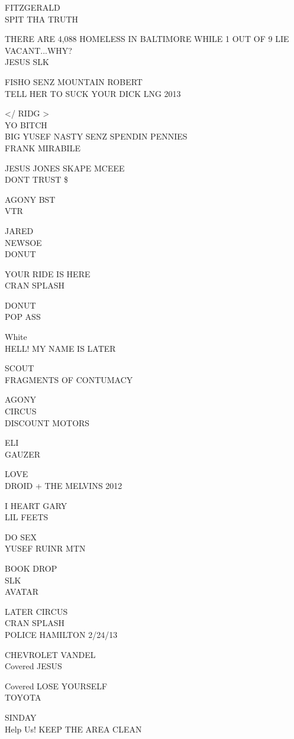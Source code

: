 \documentclass[10pt,letterpaper]{article}
\begin{document}
FITZGERALD\\
SPIT THA TRUTH

THERE ARE 4,088 HOMELESS IN BALTIMORE WHILE 1 OUT OF 9 LIE VACANT...WHY?\\
JESUS SLK

FISHO SENZ MOUNTAIN ROBERT\\
TELL HER TO SUCK YOUR DICK LNG 2013

</  RIDG >\\
YO BITCH\\
BIG YUSEF NASTY SENZ SPENDIN PENNIES\\
FRANK MIRABILE

JESUS JONES SKAPE MCEEE\\
DONT TRUST \$

AGONY BST\\
VTR

JARED\\
NEWSOE\\
DONUT

YOUR RIDE IS HERE\\
CRAN SPLASH

DONUT\\
POP ASS

White\\
HELL! MY NAME IS LATER

SCOUT\\
FRAGMENTS OF CONTUMACY

AGONY\\
CIRCUS\\
DISCOUNT MOTORS

ELI\\
GAUZER

LOVE\\
DROID + THE MELVINS 2012

I HEART GARY\\
LIL FEETS

DO SEX\\
YUSEF RUINR MTN

BOOK DROP\\
SLK\\
AVATAR

LATER CIRCUS\\
CRAN SPLASH\\
POLICE HAMILTON 2/24/13

CHEVROLET VANDEL\\
Covered JESUS

Covered LOSE YOURSELF\\
TOYOTA

SINDAY\\
Help Us! KEEP THE AREA CLEAN
\end{document}
